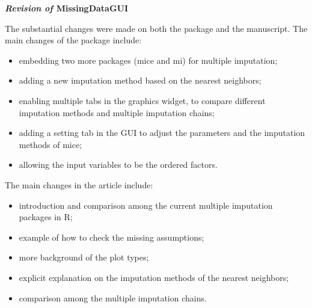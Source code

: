 \documentclass[12pt,english]{article}
\begin{document}
\begin{center}
\textbf{\textit{\LARGE{Revision of }}}\textbf{\LARGE{MissingDataGUI\bigskip{}
}}
\par\end{center}{\LARGE \par}

The substantial changes were made on both the package and the manuscript.
The main changes of the package include:

\begin{itemize}
\item embedding two more packages (mice and mi) for multiple imputation;
\item adding a new imputation method based on the nearest neighbors;
\item enabling multiple tabs in the graphics widget, to compare different
imputation methods and multiple imputation chains;
\item adding a setting tab in the GUI to adjust the parameters and the imputation
methods of mice;
\item allowing the input variables to be the ordered factors.
\end{itemize}
The main changes in the article include:
\begin{itemize}
\item introduction and comparison among the current multiple imputation
packages in R;
\item example of how to check the missing assumptions;
\item more background of the plot types;
\item explicit explanation on the imputation methods of the nearest neighbors;
\item comparison among the multiple imputation chains.
\end{itemize}
\end{document}
